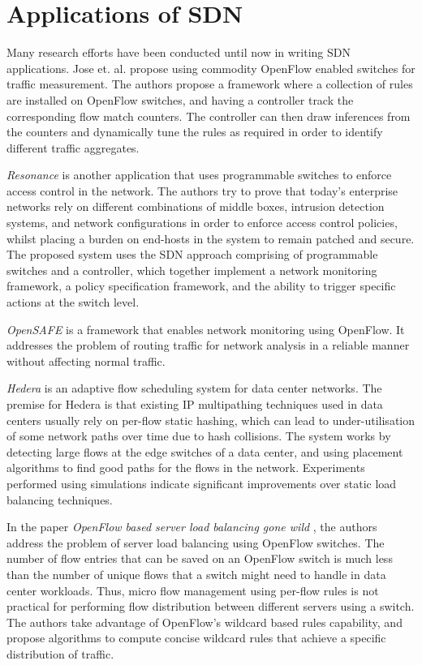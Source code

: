 \section{Applications of SDN} \label{SDN_applications}

Many research efforts have been conducted until now in writing SDN applications. Jose et. al. \cite{jose2011online} propose using commodity OpenFlow enabled switches for traffic measurement. The authors propose a framework where a collection of rules are installed on OpenFlow switches, and having a controller track the corresponding flow match counters. The controller can then draw inferences from the counters and dynamically tune the rules as required in order to identify different traffic aggregates.

\textit{Resonance} \cite{Nayak:2009:RDA:1592681.1592684} is another application that uses programmable switches to enforce access control in the network. The authors try to prove that today’s enterprise networks rely on different combinations of middle boxes, intrusion detection systems, and network configurations in order to enforce access control policies, whilst placing a burden on end-hosts in the system to remain patched and secure. The proposed system uses the SDN approach comprising of programmable switches and a controller, which together implement a network monitoring framework, a policy specification framework, and the ability to trigger specific actions at the switch level.

\textit{OpenSAFE} \cite{ballard2010extensible} is a framework that enables network monitoring using OpenFlow. It addresses the problem of routing traffic for network analysis in a reliable manner without affecting normal traffic. 

\textit{Hedera} \cite{al2010hedera} is an adaptive flow scheduling system for data center networks. The premise for Hedera is that existing IP multipathing techniques used in data centers usually rely on per-flow static hashing, which can lead to under-utilisation of some network paths over time due to hash collisions. The system works by detecting large flows at the edge switches of a data center, and using placement algorithms to find good paths for the flows in the network. Experiments performed using simulations indicate significant improvements over static load balancing techniques. 

In the paper \textit{OpenFlow based server load balancing gone wild} \cite{wang2011openflow}, the authors address the problem of server load balancing using OpenFlow switches. The number of flow entries that can be saved on an OpenFlow switch is much less than the number of unique flows that a switch might need to handle in data center workloads. Thus, micro flow management using per-flow rules is not practical for performing flow distribution between different servers using a switch. The authors take advantage of OpenFlow’s wildcard based rules capability, and propose algorithms to compute concise wildcard rules that achieve a specific distribution of traffic.


